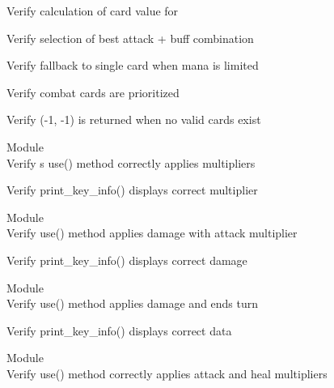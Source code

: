 \begin{DoxyRefList}
\label{test__test000123}%
%
Verify calculation of card value for   



\label{test__test000124}%
%
Verify selection of best attack + buff combination  



\label{test__test000125}%
%
Verify fallback to single card when mana is limited  



\label{test__test000126}%
%
Verify combat cards are prioritized  



\label{test__test000127}%
%
Verify (-\/1, -\/1) is returned when no valid cards exist  


\item[Module \doxylink{group___artifact_card}{Artifact\+Card} ]\hfill \\
\label{test__test000045}%
%
Verify \textquotesingle{}s use() method correctly applies multipliers  



\label{test__test000046}%
%
Verify print\+\_\+key\+\_\+info() displays correct multiplier  


\item[Module \doxylink{group___attack_spell}{Attack\+Spell} ]\hfill \\
\label{test__test000011}%
%
Verify use() method applies damage with attack multiplier  



\label{test__test000012}%
%
Verify print\+\_\+key\+\_\+info() displays correct damage  


\item[Module \doxylink{group___beast_card}{Beast\+Card} ]\hfill \\
\label{test__test000033}%
%
Verify use() method applies damage and ends turn  



\label{test__test000034}%
%
Verify print\+\_\+key\+\_\+info() displays correct data  


\item[Module \doxylink{group___buff_card}{Buff\+Card} ]\hfill \\
\label{test__test000055}%
%
Verify use() method correctly applies attack and heal multipliers  




\end{DoxyRefList}
